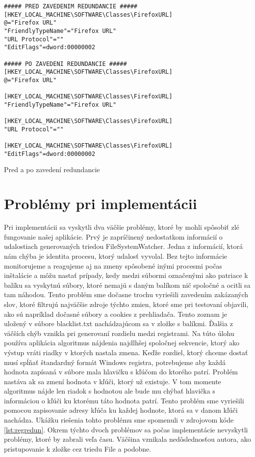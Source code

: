 \begin{listing}
\begin{verbatim}  
##### PRED ZAVEDENIM REDUNDANCIE #####
[HKEY_LOCAL_MACHINE\SOFTWARE\Classes\FirefoxURL]
@="Firefox URL"
"FriendlyTypeName"="Firefox URL"
"URL Protocol"=""
"EditFlags"=dword:00000002

##### PO ZAVEDENI REDUNDANCIE #####
[HKEY_LOCAL_MACHINE\SOFTWARE\Classes\FirefoxURL]
@="Firefox URL"

[HKEY_LOCAL_MACHINE\SOFTWARE\Classes\FirefoxURL]
"FriendlyTypeName"="Firefox URL"

[HKEY_LOCAL_MACHINE\SOFTWARE\Classes\FirefoxURL]
"URL Protocol"=""

[HKEY_LOCAL_MACHINE\SOFTWARE\Classes\FirefoxURL]
"EditFlags"=dword:00000002
\end{verbatim}
\caption{Pred a po zavedení redundancie}
\label{lst:redunexample}
\end{listing}

\section{Problémy pri implementácii}
Pri implementácii sa vyskytli dva väčšie problémy, ktoré by mohli spôsobiť zlé fungovanie našej aplikácie. Prvý je zapríčinený nedostatkom informácií o udalostiach generovaných triedou FileSystemWatcher. Jedna z informácií, ktorá nám chýba je identita procesu, ktorý udalosť vyvolal. Bez tejto informácie monitorujeme a reagujeme aj na zmeny spôsobené inými procesmi počas inštalácie a môžu nastať prípady, kedy medzi súbormi označenými ako patriace k balíku sa vyskytnú súbory, ktoré  nemajú s daným balíkom nič spoločné a ocitli sa tam náhodou. Tento problém sme dočasne trochu vyriešili zavedením zakázaných slov, ktoré filtrujú najväčšie zdroje týchto zmien, ktoré sme pri testovaní objavili, ako sú napríklad dočasné súbory a cookies z prehliadača. Tento zoznam je uložený v súbore blacklist.txt nachádzajúcom sa v zložke s balíkmi.
Ďalšia z väčších chýb vznikla pri generovaní rozdielu medzi registrami. Na túto úlohu používa aplikácia algoritmus nájdenia najdlhšej spoločnej sekvencie, ktorý ako výstup vráti riadky v ktorých nastala zmena. Keďže rozdiel, ktorý chceme dostať musí spĺňať štandardný formát Windows registra, potrebujeme aby každá hodnota zapísaná v súbore mala hlavičku s kľúčom do ktorého patrí. Problém nastáva ak sa zmení hodnota v kľúči, ktorý už existuje. V tom momente algoritmus nájde len riadok s hodnotou ale bude mu chýbať hlavička s informáciou o kľúči ku ktorému táto hodnota patrí. Tento problém sme vyriešili pomocou zapisovanie adresy kľúča ku každej hodnote, ktorá sa v danom kľúči nachádza. Ukážku riešenia tohto problému sme spomenuli v zdrojovom kóde \ref{lst:regredun}.
Okrem týchto dvoch problémov sa počas implementácie nevyskytli problémy, ktoré by zabrali veľa času. Väčšina vznikala nedôslednosťou autora, ako pristupovanie k zložke cez triedu File a podobne.